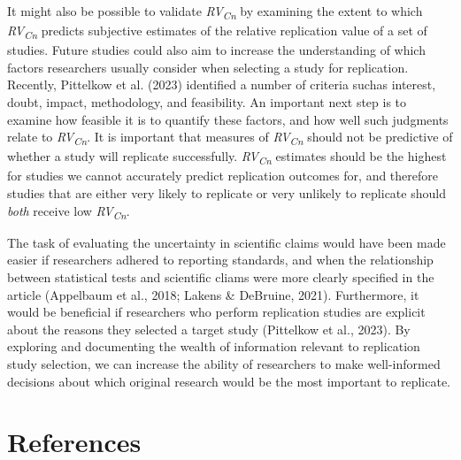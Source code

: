 \documentclass[
  man,floatsintext]{apa6}
\begin{document}
It might also be possible to validate \emph{RV\textsubscript{Cn}} by examining the extent to which \emph{RV\textsubscript{Cn}} predicts subjective estimates of the relative replication value of a set of studies. Future studies could also aim to increase the understanding of which factors researchers usually consider when selecting a study for replication. Recently, Pittelkow et al. (2023) identified a number of criteria suchas interest, doubt, impact, methodology, and feasibility. An important next step is to examine how feasible it is to quantify these factors, and how well such judgments relate to \emph{RV\textsubscript{Cn}}. It is important that measures of \emph{RV\textsubscript{Cn}} should not be predictive of whether a study will replicate successfully. \emph{RV\textsubscript{Cn}} estimates should be the highest for studies we cannot accurately predict replication outcomes for, and therefore studies that are either very likely to replicate or very unlikely to replicate should \emph{both} receive low \emph{RV\textsubscript{Cn}}.

The task of evaluating the uncertainty in scientific claims would have been made easier if researchers adhered to reporting standards, and when the relationship between statistical tests and scientific cliams were more clearly specified in the article (Appelbaum et al., 2018; Lakens \& DeBruine, 2021). Furthermore, it would be beneficial if researchers who perform replication studies are explicit about the reasons they selected a target study (Pittelkow et al., 2023). By exploring and documenting the wealth of information relevant to replication study selection, we can increase the ability of researchers to make well-informed decisions about which original research would be the most important to replicate.

\hypertarget{references}{%
\section*{References}\label{references}}
\end{document}
